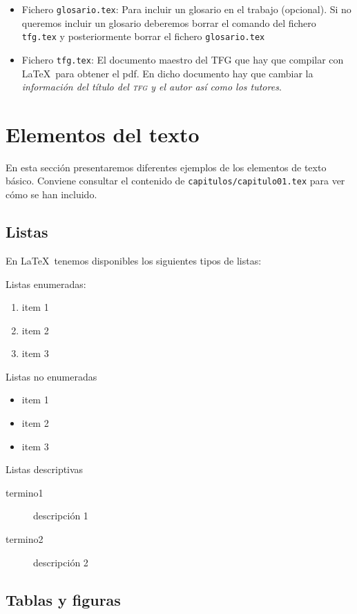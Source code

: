 \begin{itemize}
  \item Fichero \texttt{glosario.tex}: Para incluir un glosario en el trabajo (opcional). Si no queremos incluir un glosario deberemos borrar el comando \verb++ del fichero \texttt{tfg.tex} y posteriormente borrar el fichero \texttt{glosario.tex}

   \item Fichero \texttt{tfg.tex}: El documento maestro del TFG que hay que compilar con \LaTeX\ para obtener el pdf. En dicho documento hay que cambiar la \emph{información del título del \textsc{tfg} y el autor así como los tutores}.
\end{itemize}



\section{Elementos del texto}

En esta sección presentaremos diferentes ejemplos de los elementos de texto básico. Conviene consultar el contenido de \texttt{capitulos/capitulo01.tex} para ver cómo se han incluido.

\subsection{Listas}
En \LaTeX\ tenemos disponibles los siguientes tipos de listas:

Listas enumeradas:
\begin{enumerate}
  \item item 1
  \item item 2
  \item item 3
\end{enumerate}

Listas no enumeradas
\begin{itemize}
  \item item 1
  \item item 2
  \item item 3
  \end{itemize}

Listas descriptivas
\begin{description}
  \item[termino1] descripción 1
  \item[termino2] descripción 2
\end{description}
  
\subsection{Tablas y figuras}


